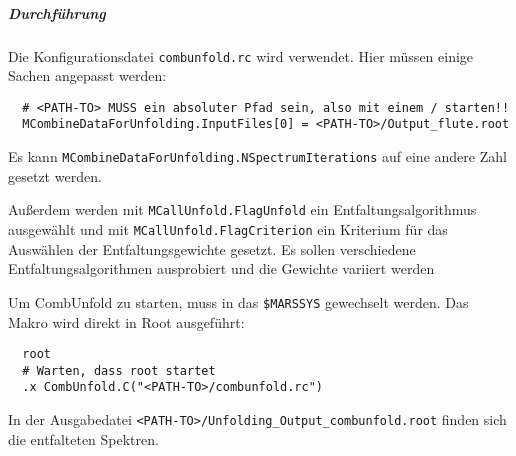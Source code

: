 \subparagraph{Durchführung}%

Die Konfigurationsdatei \texttt{combunfold.rc} wird verwendet.
Hier müssen einige Sachen angepasst werden:
\begin{lstlisting}
  # <PATH-TO> MUSS ein absoluter Pfad sein, also mit einem / starten!!
  MCombineDataForUnfolding.InputFiles[0] = <PATH-TO>/Output_flute.root
\end{lstlisting}
Es kann
\texttt{MCombineDataForUnfolding.NSpectrumIterations}
auf eine andere Zahl gesetzt werden.

Außerdem werden mit
\texttt{MCallUnfold.FlagUnfold}
ein Entfaltungsalgorithmus ausgewählt und mit
\texttt{MCallUnfold.FlagCriterion}
ein Kriterium für das Auswählen der Entfaltungsgewichte gesetzt.
Es sollen verschiedene Entfaltungsalgorithmen ausprobiert
und die Gewichte variiert werden

Um CombUnfold zu starten, muss in das
\texttt{\$MARSSYS}
gewechselt werden.
Das Makro wird direkt in Root ausgeführt:
\begin{lstlisting}
  root
  # Warten, dass root startet
  .x CombUnfold.C("<PATH-TO>/combunfold.rc")
\end{lstlisting}

In der Ausgabedatei
\texttt{<PATH-TO>/Unfolding\_Output\_combunfold.root}
finden sich die entfalteten Spektren.
